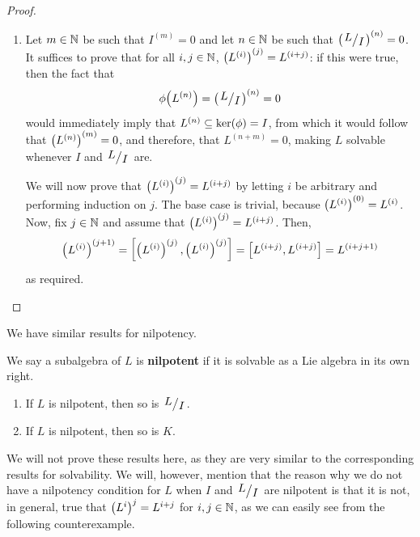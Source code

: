 \begin{proof}
\begin{enumerate}
        \item Let $m \in \mathbb{N}$ be such that $I^{(m)} = 0$ and let $n \in \mathbb{N}$ be such that $\parenth{\quotient{L}{I}}^{(n)} = 0$. It suffices to prove that for all $i, j \in \mathbb{N}$, $\left( L^{(i)} \right)^{(j)} = L^{(i + j)}$: if this were true, then the fact that
        \begin{align*}
            \phiof{L^{(n)}} = \parenth{\quotient{L}{I}}^{(n)} = 0
        \end{align*}
        would immediately imply that $L^{(n)} \subseteq \operatorname{ker}\!\left( \phi \right) = I$, from which it would follow that $\left( L^{(n)} \right)^{(m)} = 0$, and therefore, that $L^{(n + m)} = 0$, making $L$ solvable whenever $I$ and $\quotient{L}{I}$ are.

        We will now prove that $\left( L^{(i)} \right)^{(j)} = L^{(i + j)}$ by letting $i$ be arbitrary and performing induction on $j$. The base case is trivial, because $\left( L^{(i)} \right)^{(0)} = L^{(i)}$. Now, fix $j \in \mathbb{N}$ and assume that $\left( L^{(i)} \right)^{(j)} = L^{(i + j)}$. Then,
        \begin{align*}
            \left( L^{(i)} \right)^{(j + 1)} = \left[ \left( L^{(i)} \right)^{(j)}, \left( L^{(i)} \right)^{(j)} \right] = \left[ L^{(i + j)}, L^{(i + j)} \right] = L^{(i + j + 1)}
        \end{align*}
        as required.
    \end{enumerate}
\end{proof}

We have similar results for nilpotency.

\begin{boxdefinition}
    We say a subalgebra of $L$ is \textbf{nilpotent} if it is solvable as a Lie algebra in its own right.
\end{boxdefinition}

\begin{boxproposition}
    \hfill
    \begin{enumerate}[label = \normalfont\arabic*., noitemsep]
        \item If $L$ is nilpotent, then so is $\quotient{L}{I}$.
        \item If $L$ is nilpotent, then so is $K$.
    \end{enumerate}
\end{boxproposition}

We will not prove these results here, as they are very similar to the corresponding results for solvability. We will, however, mention that the reason why we do not have a nilpotency condition for $L$ when $I$ and $\quotient{L}{I}$ are nilpotent is that it is not, in general, true that $\left( L^i \right)^j = L^{i + j}$ for $i, j \in \mathbb{N}$, as we can easily see from the following counterexample.

